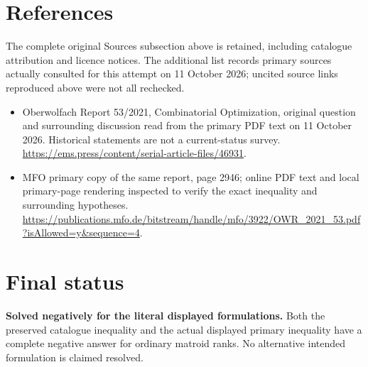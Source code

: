 \documentclass[11pt]{article}
\begin{document}
\section{References}
The complete original Sources subsection above is retained, including catalogue attribution and licence notices. The additional list records primary sources actually consulted for this attempt on 11 October 2026; uncited source links reproduced above were not all rechecked.
\begin{itemize}
\item Oberwolfach Report 53/2021, Combinatorial Optimization, original question and surrounding discussion read from the primary PDF text on 11 October 2026. Historical statements are not a current-status survey. \url{https://ems.press/content/serial-article-files/46931}.
\item MFO primary copy of the same report, page 2946; online PDF text and local primary-page rendering inspected to verify the exact inequality and surrounding hypotheses. \url{https://publications.mfo.de/bitstream/handle/mfo/3922/OWR_2021_53.pdf?isAllowed=y&sequence=4}.
\end{itemize}
\section{Final status}
\textbf{Solved negatively for the literal displayed formulations.} Both the preserved catalogue inequality and the actual displayed primary inequality have a complete negative answer for ordinary matroid ranks. No alternative intended formulation is claimed resolved.
\end{document}
